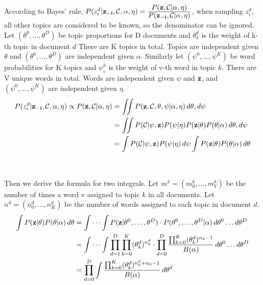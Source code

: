 \documentclass[11pt]{article}
\begin{document}
\begin{spacing}{1.6}
\noindent 
According to Bayes' rule, $P({z^d_i}| {\bf{z}_{-i}},\mathcal{C},\alpha,\eta)=\frac{\displaystyle P(\bf{z},\mathcal{C}|\alpha,\eta)}{\displaystyle P(\bf{z}_{-i},\mathcal{C}|\alpha,\eta)}$, when sampling $z^d_i$, all other topics are considered to be known, so the denominator can be ignored. Let $(\theta^0,\ldots,\theta^D)$ be topic proportions for D documents and $\theta^d_k$ is the weight of k-th topic in document $d$ There are K topics in total. Topics are independent given $\theta$ and $(\theta^0,\ldots,\theta^D)$ are independent given $\alpha$. Similarly let $(\psi^0,\ldots,\psi^K)$ be word probabilities for K topics and $\psi^k_v$ is the weight of v-th word in topic $k$. There are V unique words in total. Words are independent given $\psi$ and $\bf{z}$, and $(\psi^0,\ldots,\psi^K)$ are independent given $\eta$.\\
\begin{equation} \label{eq1}
\begin{split}
P({z^d_i}| {\bf{z}_{-i}},\mathcal{C},\alpha,\eta) \propto {P(\bf{z},\mathcal{C}|\alpha,\eta)}
& = \iint  P({\bf{z}},\mathcal{C},\theta,\psi|\alpha,\eta) \, d\theta,d\psi\\
 & = \iint  P(\mathcal{C}|\psi,{\bf{z}}) P({\psi}|\eta) P({\bf{z}}|\theta) P(\theta|\alpha) \, d\theta,d\psi\\
 & = \int P(\mathcal{C}|\psi,{\bf{z}}) P({\psi}|\eta) \, d\psi \int P({\bf{z}}|\theta) P(\theta|\alpha) \, d\theta\\
\                
\end{split}
\end{equation}\\
\noindent Then we derive the formula for two integrals. Let $m^k=(m^k_0,\ldots,m^k_V)$ be the number of times a word v assigned to topic $k$ in all documents. Let $n^d=(n^d_0,\ldots,n^d_K)$ be the number of words assigned to each topic in document $d$. \\
\begin{equation} \label{eq1}
\begin{split}
\int P({\bf{z}}|\theta) P(\theta|\alpha) \, d\theta 
                 & = \idotsint P({\bf{z}}|\theta^0,\ldots,\theta^D) \cdot P(\theta^0,\ldots,\theta^D | \alpha) \,d\theta^0 \ldots d\theta^D\\
                 & = \idotsint \prod_{d=1}^{D}\prod_{k=0}^{K} ({\theta^d_k})^{n^d_k} \cdot \prod_{d=0}^{D}\frac{\prod_{k=0}^{K} ({\theta^d_k})^{\alpha_k-1}}{B(\alpha)} \,d\theta^0 \ldots d\theta^D\\
                 & = \prod_{d=0}^{D} \int \frac{\prod_{k=0}^{K} ({\theta^d_k})^{{n^d_k}+\alpha_k-1}}{B(\alpha)} \,d\theta^d \\

\end{split}
\end{equation}
\end{spacing}
\end{document}
